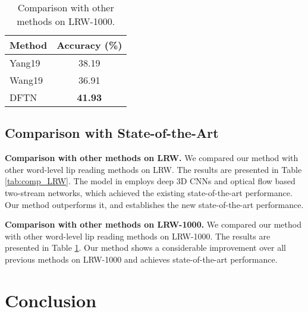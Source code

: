 \documentclass[a4paper, 10pt, conference]{ieeeconf}      \usepackage{FG2020}
\begin{document}
\begin{table}
       \caption{Comparison with other methods on LRW-1000. }
       \label{tab:comp_lrw-1000}
       \begin{center}
       \begin{tabular}{|l|c|}
       \hline
       Method & Accuracy (\%) \\
       \hline\hline
       Yang19 \cite{yang2019lrw} &  38.19\\
       Wang19 \cite{wang2019multi} &  36.91\\
       DFTN & \textbf{41.93} \\
       \hline
       \end{tabular}
       \end{center}
       \vspace{-0.4cm}
       \end{table}




 \subsection{Comparison with State-of-the-Art}
 
 \textbf{Comparison with other methods on LRW.} We compared our method with other word-level lip reading methods \cite{Chung2016LipRI, Stafylakis2017CombiningRN, weng2019importance} on LRW. 
The results are presented in Table \ref{tab:comp_LRW}.  The model in \cite{weng2019importance} employs deep 3D CNNs and optical flow based two-stream networks, which achieved the existing state-of-the-art performance. Our method outperforms it, and establishes the  new state-of-the-art performance. 
 
 \textbf{Comparison with other methods on LRW-1000.} We compared our method with other word-level lip reading methods \cite{yang2019lrw, wang2019multi} on LRW-1000. The results are presented in Table \ref{tab:comp_lrw-1000}. Our method shows a considerable improvement over all previous methods on LRW-1000 and achieves state-of-the-art performance.
 
 


 
 
 






\section{Conclusion}
 \label{sec:conclusion}
 
\end{document}
